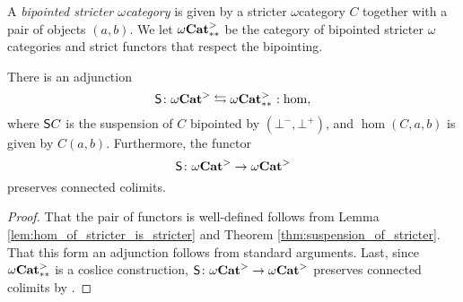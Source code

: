 \begin{dfn} 
    A \emph{bipointed stricter \( \omega \)\nbd category} is given by a stricter \( \omega \)\nbd category \( C \) together with a pair of objects \( (a, b) \).
    We let \( {\omega\mathbf{Cat}}^>_{**} \) be the category of bipointed stricter \( \omega \)\nbd categories and strict functors that respect the bipointing.
\end{dfn}

\begin{cor} \label{cor:adjunction_hom_suspension}
    There is an adjunction
    \begin{equation*}
        \sus{} \colon \somegaCat \leftrightarrows \bpt\somegaCat \cocolon \hom,
    \end{equation*}
    where \( \mathsf{S}{C} \) is the suspension of \( C \) bipointed by \( (\bot^-, \bot^+) \), and \( \hom(C, a, b) \) is given by \( C(a, b) \).
    Furthermore, the functor
    \begin{equation*}
        \mathsf{S}{} \colon {\omega\mathbf{Cat}}^> \to {\omega\mathbf{Cat}}^>
    \end{equation*}
    preserves connected colimits.
\end{cor}
\begin{proof}
    That the pair of functors is well-defined follows from Lemma \ref{lem:hom_of_stricter_is_stricter} and Theorem \ref{thm:suspension_of_stricter}.
    That this form an adjunction follows from standard arguments.
    Last, since \( {\omega\mathbf{Cat}}^>_{**} \) is a coslice construction, \( \mathsf{S}{} \colon {\omega\mathbf{Cat}}^> \to {\omega\mathbf{Cat}}^> \) preserves connected colimits by \cite[Proposition 3.3.8]{riehl2019context}.
\end{proof}

